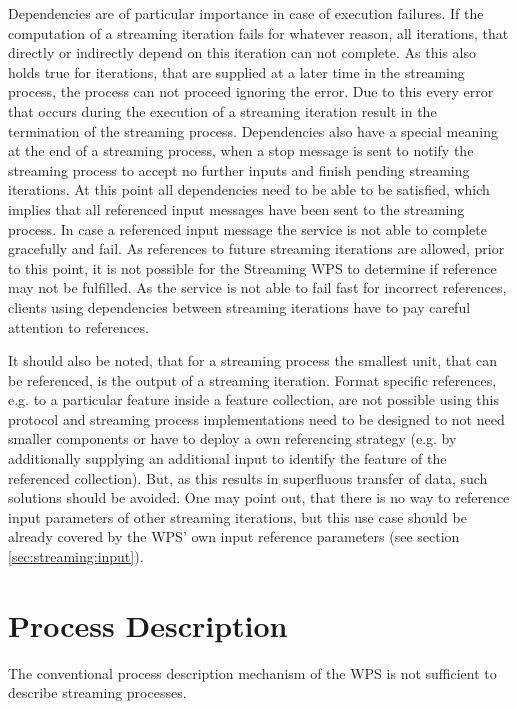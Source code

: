		Dependencies are of particular importance in case of execution failures. If the computation of a streaming iteration fails for whatever reason, all iterations, that directly or indirectly depend on this iteration can not complete. As this also holds true for iterations, that are supplied at a later time in the streaming process, the process can not proceed ignoring the error. Due to this every error that occurs during the execution of a streaming iteration result in the termination of the streaming process.
		Dependencies also have a special meaning at the end of a streaming process, when a stop message is sent to notify the streaming process to accept no further inputs and finish pending streaming iterations. At this point all dependencies need to be able to be satisfied, which implies that all referenced input messages have been sent to the streaming process. In case a referenced input message the service is not able to complete gracefully and fail. As references to future streaming iterations are allowed, prior to this point, it is not possible for the Streaming \ac{WPS} to determine if reference may not be fulfilled. As the service is not able to fail fast for incorrect references, clients using dependencies between streaming iterations have to pay careful attention to references.

		It should also be noted, that for a streaming process the smallest unit, that can be referenced, is the output of a streaming iteration. Format specific references, e.g. to a particular feature inside a feature collection, are not possible using this protocol and streaming process implementations need to be designed to not need smaller components or have to deploy a own referencing strategy (e.g. by additionally supplying an additional input to identify the feature of the referenced collection). But, as this results in superfluous transfer of data, such solutions should be avoided. One may point out, that there is no way to reference input parameters of other streaming iterations, but this use case should be already covered by the \ac{WPS}' own input reference parameters (see section \ref{sec:streaming:input}).

	\section{Process Description}
		\label{sec:stream:processdescription}
		The conventional process description mechanism of the \ac{WPS} is not sufficient to describe streaming processes.

